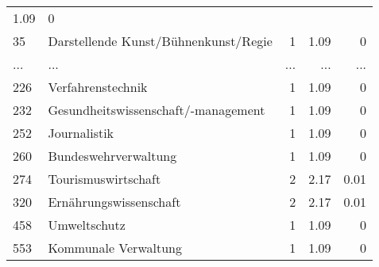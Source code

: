 \begin{longtable}{lXrrr}
          \num[round-mode=places,round-precision=2]{1,09} &
          \num[round-mode=places,round-precision=2]{0} \\
        35 & \multicolumn{1}{X}{Darstellende Kunst/Bühnenkunst/Regie} & %
          \num{1} &
          \num[round-mode=places,round-precision=2]{1,09} &
          \num[round-mode=places,round-precision=2]{0} \\
       ... & ... & ... & ... & ... \\
        226 & \multicolumn{1}{X}{Verfahrenstechnik} & %
          \num{1} &
          \num[round-mode=places,round-precision=2]{1,09} &
          \num[round-mode=places,round-precision=2]{0} \\

        232 & \multicolumn{1}{X}{Gesundheitswissenschaft/-management} & %
          \num{1} &
          \num[round-mode=places,round-precision=2]{1,09} &
          \num[round-mode=places,round-precision=2]{0} \\

        252 & \multicolumn{1}{X}{Journalistik} & %
          \num{1} &
          \num[round-mode=places,round-precision=2]{1,09} &
          \num[round-mode=places,round-precision=2]{0} \\

        260 & \multicolumn{1}{X}{Bundeswehrverwaltung} & %
          \num{1} &
          \num[round-mode=places,round-precision=2]{1,09} &
          \num[round-mode=places,round-precision=2]{0} \\

        274 & \multicolumn{1}{X}{Tourismuswirtschaft} & %
          \num{2} &
          \num[round-mode=places,round-precision=2]{2,17} &
          \num[round-mode=places,round-precision=2]{0,01} \\

        320 & \multicolumn{1}{X}{Ernährungswissenschaft} & %
          \num{2} &
          \num[round-mode=places,round-precision=2]{2,17} &
          \num[round-mode=places,round-precision=2]{0,01} \\

        458 & \multicolumn{1}{X}{Umweltschutz} & %
          \num{1} &
          \num[round-mode=places,round-precision=2]{1,09} &
          \num[round-mode=places,round-precision=2]{0} \\

        553 & \multicolumn{1}{X}{Kommunale Verwaltung} & %
          \num{1} &
          \num[round-mode=places,round-precision=2]{1,09} &
          \num[round-mode=places,round-precision=2]{0} \\


\end{longtable}
